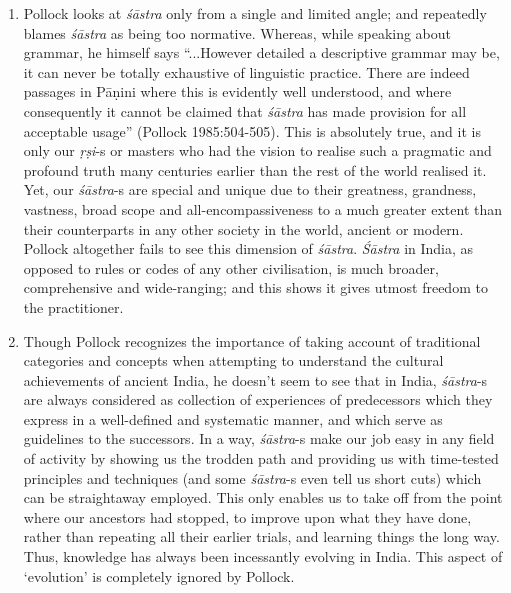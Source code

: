 \begin{enumerate}
\item Pollock looks at {\it śāstra} only from a single and limited angle; and repeatedly blames {\it śāstra} as being too normative. Whereas, while speaking about grammar, he himself says ``...However detailed a descriptive grammar may be, it can never be totally exhaustive of linguistic practice. There are indeed passages in Pāṇini where this is evidently well understood, and where consequently it cannot be claimed that {\it śāstra} has made provision for all acceptable usage'' (Pollock 1985:504-505). This is absolutely true, and it is only our {\it ṛṣi}-s or masters who had the vision to realise such a pragmatic and profound truth many centuries earlier than the rest of the world realised it.  Yet, our {\it śāstra}-s are special and unique due to their greatness, grandness, vastness, broad scope and all-encompassiveness to a much greater extent than their counterparts in any other society in the world, ancient or modern. Pollock altogether fails to see this dimension of {\it śāstra}. {\it Śāstra} in India, as opposed to rules or codes of any other civilisation, is much broader, comprehensive and wide-ranging; and this shows it gives utmost freedom to the practitioner.

\item Though Pollock recognizes the importance of taking account of traditional categories and concepts when attempting to understand the cultural achievements of ancient India, he doesn't seem to see that in India, {\it śāstra}-s are always considered as collection of experiences of predecessors which they express in a well-defined and systematic manner, and which serve as guidelines to the successors. In a way, {\it śāstra}-s make our job easy in any field of activity by showing us the trodden path and providing us with time-tested principles and techniques (and some {\it śāstra}-s even tell us short cuts) which can be straightaway employed. This only enables us to take off from the point where our ancestors had stopped, to improve upon what they have done, rather than repeating all their earlier trials, and learning things the long way. Thus, knowledge has always been incessantly evolving in India. This aspect of `evolution' is completely ignored by Pollock.


\end{enumerate}
